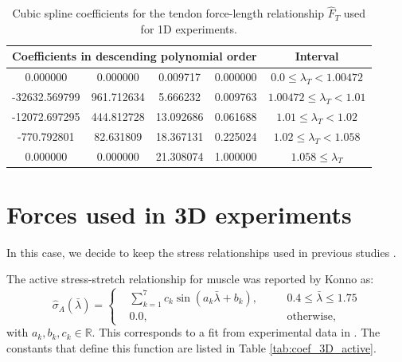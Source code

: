 \documentclass{sfuthesis}
\numberwithin{equation}{section}
\numberwithin{figure}{chapter}
\numberwithin{table}{chapter}
\theoremstyle{definition}
\newcommand{\R}{\mathbb{R}}
\begin{document}
\begin{appendices}
\begin{table}
\centering
\begin{tabular}{|cccc|c|}
\hline
\multicolumn{4}{|c|}{Coefficients in descending polynomial order} & Interval \\\hline
0.000000 & 0.000000 & 0.009717 & 0.000000  & $0.0 \leq \lambda_T < 1.00472$\\
-32632.569799 & 961.712634 & 5.666232 & 0.009763 & $1.00472 \leq \lambda_T < 1.01$\\
-12072.697295 & 444.812728 & 13.092686 & 0.061688 & $1.01 \leq \lambda_T < 1.02$ \\
-770.792801 & 82.631809 & 18.367131 & 0.225024 & $1.02 \leq \lambda_T < 1.058$\\
0.000000 & 0.000000 & 21.308074 & 1.000000 & $1.058 \leq \lambda_T $\\
\hline
\end{tabular}
\caption{Cubic spline coefficients for the tendon force-length relationship $\widehat{F}_T$ used for 1D experiments.\label{tab:coef_1D_tendon}}
\end{table}

\section{Forces used in 3D experiments}

In this case, we decide to keep the stress relationships used in previous studies \cite{Seba,KonnoNigamWakeling2021_ECM,Paper3_RossEtAl2021,Paper2_RyanEtAl2020,Paper1_WakelingEtAl2020}.

The active stress-stretch relationship for muscle was reported by Konno \cite{KonnoNigamWakeling2021_ECM} as:
\begin{equation} 
\widehat{\sigma}_A(\bar{\lambda}) = \left\{
\begin{aligned}
&\sum_{k=1}^7 c_k \sin \left( a_k \bar{\lambda} + b_k \right), \quad && 0.4 \leq \bar{\lambda} \leq 1.75 \\
&0.0, \quad &&\text{otherwise},
\end{aligned}
\right.
\end{equation}
with $a_k, b_k, c_k \in \R$. This corresponds to a fit from experimental data in \cite{Winters2011}. The constants that define this function are listed in Table \ref{tab:coef_3D_active}.


\end{appendices}
\end{document}
